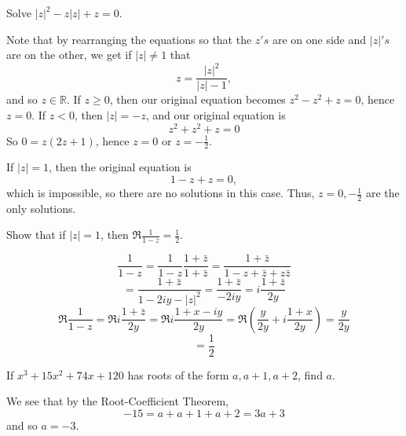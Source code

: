 \documentclass[11pt,dvipsnames]{book}
\def\R{\mathbb{R}}
\numberwithin{equation}{section} %
\numberwithin{figure}{section} %
\numberwithin{table}{section} %
\begin{document}
\begin{exercise} Solve $|z|^2 - z|z| + z = 0$. 

\begin{solution}
Note that by rearranging the equations so that the $z's$ are on one side and $|z|'s$ are on the other, we get if $|z|\neq 1$ that 
\[
z  =\frac{|z|^{2}}{|z|-1},\]
and so $z\in\R$. If $z\geq 0$, then our original equation becomes $z^2-z^2+z=0$, hence $z=0$. If $z<0$, then $|z|=-z$, and our original equation is 
\[
z^2+z^2+z=0\]
So $0=z(2z+1)$, hence $z=0$ or $z=-\frac{1}{2}$. 

If $|z|=1$, then the original equation is
\[
1-z+z=0,\]
which is impossible, so there are no solutions in this case. Thus, $z=0,-\frac{1}{2}$ are the only solutions.
\end{solution}


\end{exercise}




\begin{exercise} Show that if $|z| = 1$, then $\Re\frac{1}{1-z} =
\frac{1}{2}$.

\begin{solution}
\[ \frac{1}{1-z} = \frac{1}{1-z}\frac{1+\bar{z}}{1+\bar{z}} =
\frac{1+\bar{z}}{1-z+\bar{z} + z\bar{z}}\]
\[ =
\frac{1+\bar{z}}{1-2iy-|z|^{2}}=\frac{1+\bar{z}}{-2iy}=i\frac{1+\bar{z}}{2y}\]
\[\Re \frac{1}{1-z} = \Re i\frac{1+\bar{z}}{2y} = \Re
i\frac{1+x-iy}{2y} = \Re\left(\frac{y}{2y} + i\frac{1+x}{2y}\right) =
\frac{y}{2y}\]
\[=\frac{1}{2}\]
\end{solution}


\end{exercise}



%
%





\begin{exercise} If $x^3+15x^2+74x+120$ has roots of the form $a,a+1,a+2$, find $a$.

\begin{solution}
We see that by the Root-Coefficient Theorem,
\[
-15=a+a+1+a+2=3a+3\]
and so $a=-3$.
\end{solution}

\end{exercise}
\end{document}
